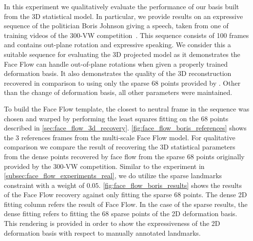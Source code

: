 In this experiment we qualitatively evaluate the performance of our basis
built from the 3D statistical model. In particular, we provide results on
an expressive sequence of the politician Boris Johnson giving a speech, taken
from one of training videos of the 
300-VW competition~\cite{Chrysos:2015gt,shen2015first}. This sequence consists
of 100 frames and contains out-plane rotation and expressive speaking. We
consider this a suitable sequence for evaluating the 3D projected model
as it demonstrates the Face Flow can handle out-of-plane rotations when
given a properly trained deformation basis. It also demonstrates the quality
of the 3D reconstruction recovered in comparison to using only the sparse
68 points provided by \citet{shen2015first}. Other than the change of deformation
basis, all other parameters were maintained.

To build the Face Flow template, the closest to neutral frame in the sequence 
was chosen and warped by performing the least squares fitting on the 68 
points described in \cref{sec:face_flow_3d_recovery}. 
\cref{fig:face_flow_boris_references} shows the 3 references frames from 
the multi-scale Face Flow model. For qualitative comparison we compare the result
of recovering the 3D statistical parameters from the dense points recovered by
face flow from the sparse 68 points originally provided by the 300-VW competition.
Similar to the experiment in \cref{subsec:face_flow_experiments_real}, we do
utilize the sparse landmarks constraint with a weight of $0.05$. 
\cref{fig:face_flow_boris_results} shows the results of the Face Flow recovery
against only fitting the sparse 68 points. The dense 2D fitting column refers
the result of Face Flow. In the case of the sparse results, the dense fitting
refers to fitting the 68 sparse points of the 2D deformation basis. This
rendering is provided in order to show the expressiveness of the 2D deformation
basis with respect to manually annotated landmarks.

